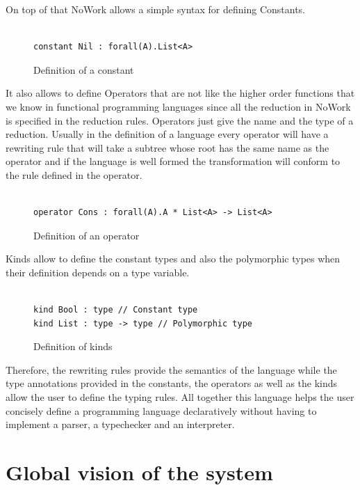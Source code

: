 \documentclass[12pt,a4paper]{article}
\begin{document}
On top of that NoWork allows a simple syntax for defining Constants.

\begin{figure}[!h]
\begin{verbatim}

constant Nil : forall(A).List<A>
\end{verbatim}
\caption{Definition of a constant}
\end{figure}


It also allows to define Operators that are not like the higher order functions
that we know in functional programming languages since all the
reduction in NoWork is specified in the reduction rules. Operators
just give the name and the type of a reduction. Usually in the
definition of a language every operator will have a rewriting rule
that will take a subtree whose root has the same name as the operator
and if the language is well formed the transformation will conform to
the rule defined in the operator.


\begin{figure}[!h]
\begin{verbatim}

operator Cons : forall(A).A * List<A> -> List<A>

\end{verbatim}
\caption{Definition of an operator}
\end{figure}

Kinds allow to define the constant types and also the polymorphic types when
their definition depends on a type variable.

\begin{figure}[!h]
\begin{verbatim}

kind Bool : type // Constant type
kind List : type -> type // Polymorphic type
\end{verbatim}
\caption{Definition of kinds}
\end{figure}

Therefore, the rewriting rules provide the semantics of the language
while the type annotations provided in the constants, the operators as well
as the kinds allow the user to define the typing rules. All together
this language helps the user concisely define a programming language
declaratively without having to implement a parser, a typechecker and
an interpreter.

\section{Global vision of the system}
\end{document}
